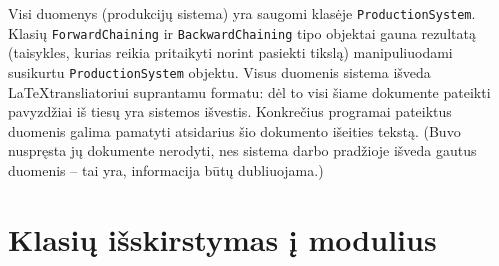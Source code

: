 \begin{sloppypar}
Visi duomenys (produkcijų sistema) yra saugomi klasėje
\verb|ProductionSystem|. Klasių \verb|ForwardChaining| ir
\verb|BackwardChaining| tipo objektai gauna rezultatą (taisykles,
kurias reikia pritaikyti norint pasiekti tikslą) manipuliuodami
susikurtu \verb|ProductionSystem| objektu. Visus duomenis sistema
išveda \LaTeX transliatoriui suprantamu formatu: dėl to visi šiame
dokumente pateikti pavyzdžiai iš tiesų yra sistemos išvestis.
Konkrečius programai pateiktus duomenis galima pamatyti atsidarius šio
dokumento išeities tekstą. (Buvo nuspręsta jų dokumente nerodyti,
nes sistema darbo pradžioje išveda gautus duomenis – tai yra,
informacija būtų dubliuojama.)
\end{sloppypar}

\section{Klasių išskirstymas į modulius}

